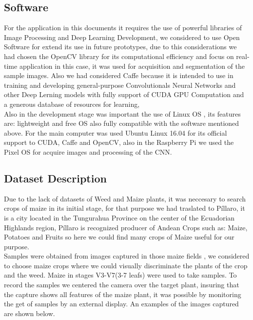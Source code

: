 \documentclass[conference]{IEEEtran}
\begin{document}
\subsection{Software}

For the application in this documents it requires the use of powerful libraries of Image Processing and Deep Learning Development, we considered to use Open Software for extend its use in future prototypes, due to this considerations we had chosen the OpenCV library for its computational efficiency and focus on real-time application \cite{opencv_library} in this  case, it was used for acquisition and segmentation of the sample images. Also we had considered Caffe because it is intended to use in training and developing general-purpose Convolutionals Neural Networks and other Deep Lerning models \cite{jia2014caffe} with fully support of CUDA GPU Computation and a generous database of resources for learning,	
\\

Also in the development stage was important the use of Linux OS , its features are: lightweight and free OS also fully compatible with the software mentioned above. For the main computer was used Ubuntu Linux 16.04 for its official support to CUDA, Caffe and OpenCV, also in the Raspberry Pi we used the Pixel OS for acquire images and processing of the CNN.
\\

\subsection{Dataset Description}
Due to the lack of datasets of Weed and Maize plants, it was neccesary to search crops of maize in its initial stage, for that purpose we had traslated to P\'illaro, it is a city located in the Tungurahua Province on the center of the Ecuadorian Highlands region, P\'illaro is recognized producer of Andean Crops such as: Maize, Potatoes and Fruits so here we could find many crops of Maize useful for our purpose. \\


Samples were obtained from images captured in those maize fields , we considered to choose maize crops where we could visually discriminate the plants of the crop and the weed. Maize in stages V3-V7(3-7 leafs) \cite{fassio1998maiz} were used to take samples. To record the samples we centered the camera over the target plant, insuring that the capture shows all features of the maize plant, it was possible by monitoring the get of samples by an external display. An examples of the images captured are shown below. 
\end{document}
